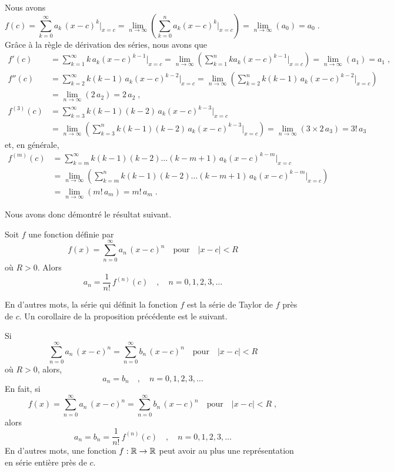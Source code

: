 {Nous avons
\[
f(c) = \sum_{k=0}^\infty a_k \, (x-c)^k \bigg|_{x=c}
= \lim_{n\rightarrow \infty}
\left( \sum_{k=0}^n a_k (x-c)^k \bigg|_{x=c} \right)
= \lim_{n\rightarrow \infty} \left( a_0 \right) = a_0 \; .
\]
Grâce à la règle de dérivation des séries, nous avons que
\begin{align*}
f'(c) &= \sum_{k=1}^\infty k\,a_k (x-c)^{k-1} \bigg|_{x=c}
= \lim_{n\rightarrow \infty}
\left( \sum_{k=1}^n k a_k (x-c)^{k-1} \bigg|_{x=c}\right)
= \lim_{n\rightarrow \infty} \left( a_1 \right) = a_1 \; , \\
f''(c) &= \sum_{k=2}^\infty k(k-1)\,a_k (x-c)^{k-2} \bigg|_{x=c}
= \lim_{n\rightarrow \infty}
\left( \sum_{k=2}^n k(k-1)\,a_k (x-c)^{k-2} \bigg|_{x=c} \right) \\
&= \lim_{n\rightarrow \infty} \left( 2\, a_2 \right) = 2\, a_2 \; , \\
f^{(3)}(c) &= \sum_{k=3}^\infty k(k-1)(k-2)\,a_k (x-c)^{k-3} \bigg|_{x=c} \\
&= \lim_{n\rightarrow \infty}
\left( \sum_{k=3}^n k(k-1)(k-2)\, a_k (x-c)^{k-3} \bigg|_{x=c} \right)
= \lim_{n\rightarrow \infty} \left( 3\times 2 \,a_3 \right) = 3!\, a_3
\end{align*}
et, en générale,
\begin{align*}
f^{(m)}(c) &= \sum_{k=m}^\infty k(k-1)(k-2)\ldots(k-m+1)\,a_k
(x-c)^{k-m} \bigg|_{x=c} \\
&= \lim_{n\rightarrow \infty}
\left( \sum_{k=m}^n k(k-1)(k-2)\ldots(k-m+1)\,a_k (x-c)^{k-m}
\bigg|_{x=c} \right) \\
&= \lim_{n\rightarrow \infty} \left( m! \,a_m \right)
= m! \, a_m \; .
\end{align*}

Nous avons donc démontré le résultat suivant.

\begin{prop}
Soit $f$ une fonction définie par
\[
f(x) = \sum_{n=0}^\infty a_n \, (x-c)^n \quad \text{pour} \quad |x-c|<R
\]
où $R>0$.  Alors
\[
a_n = \frac{1}{n!}\, f^{(n)}(c) \quad , \quad n=0,1,2,3,\ldots
\]
\end{prop}

En d'autres mots, la série qui définit la fonction $f$ est la série de Taylor
de $f$ près de $c$.  Un corollaire de la proposition précédente est le
suivant.

\begin{cor} \label{uniqueSeries}
Si
\[
\sum_{n=0}^\infty a_n \, (x-c)^n = \sum_{n=0}^\infty b_n \, (x-c)^n
\quad \text{pour} \quad |x-c|<R
\]
où $R>0$, alors,
\[
a_n = b_n  \quad , \quad n=0,1,2,3,\ldots
\]
En fait, si
\[
f(x) = \sum_{n=0}^\infty a_n \, (x-c)^n = \sum_{n=0}^\infty b_n \, (x-c)^n
\quad \text{pour} \quad |x-c|<R \; ,
\]
alors
\[
a_n = b_n = \frac{1}{n!}\,f^{(n)}(c) \quad , \quad n=0,1,2,3,\ldots
\]
En d'autres mots, une fonction $f:\mathbb{R} \rightarrow \mathbb{R}$ peut avoir au
plus une représentation en série entière près de $c$.
\end{cor}

}
